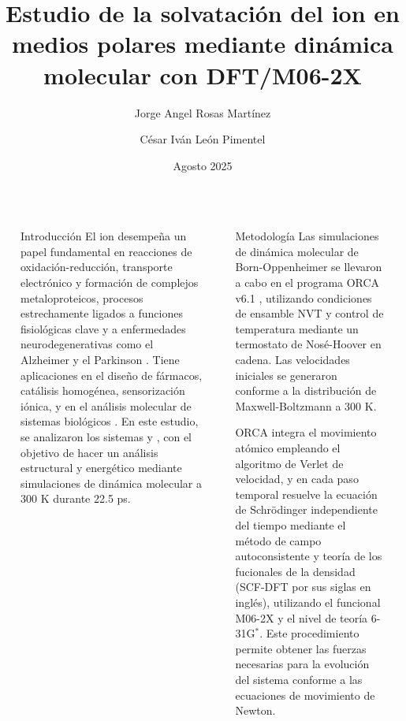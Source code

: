 \documentclass[final]{beamer}
\title{Estudio de la solvatación del ion \ce{Cu^{2+}} en medios polares mediante dinámica molecular con DFT/M06-2X}
\author{Jorge Angel Rosas Martínez \inst{1} \and César Iván León Pimentel \inst{2}}
\institute[shortinst]{\inst{1} Facultad de Química, UNAM }
\date{Agosto 2025}
\newlength{\sepwidth}
\newlength{\colwidth}
\newcommand{\separatorcolumn}{\begin{column}{\sepwidth}\end{column}}
\begin{document}
	
\begin{frame}[t]
	
	\begin{columns}[t]
		\separatorcolumn

		\begin{column}{\colwidth}
			\begin{block}{Introducción}
				El ion  desempeña un papel fundamental en reacciones de oxidación-reducción, transporte electrónico y formación de complejos metaloproteicos, procesos estrechamente ligados a funciones fisiológicas clave y a enfermedades neurodegenerativas como el Alzheimer y el Parkinson \cite{Me-2022-01}. Tiene aplicaciones en el diseño de fármacos, catálisis homogénea, sensorización iónica, y en el análisis molecular de sistemas biológicos \cite{Me-2023-01}. En este estudio, se analizaron los sistemas  y , con el objetivo de hacer un análisis estructural y energético mediante simulaciones de dinámica molecular a 300 K durante 22.5 ps.

			\end{block}

			
		\end{column}

		\separatorcolumn

		\begin{column}{\colwidth}
			\begin{block}{Metodología}
				Las simulaciones de dinámica molecular de Born-Oppenheimer se llevaron a cabo en el programa ORCA v6.1 \cite{orca6.1}, utilizando condiciones de ensamble NVT y control de temperatura mediante un termostato de Nosé-Hoover en cadena. Las velocidades iniciales se generaron conforme a la distribución de Maxwell-Boltzmann a 300 K.

				ORCA integra el movimiento atómico empleando el algoritmo de Verlet de velocidad, y en cada paso temporal resuelve la ecuación de Schrödinger independiente del tiempo mediante el método de campo autoconsistente y teoría de los fucionales de la densidad (SCF-DFT por sus siglas en inglés), utilizando el funcional M06-2X y el nivel de teoría 6-31G$^\ast$. Este procedimiento permite obtener las fuerzas necesarias para la evolución del sistema conforme a las ecuaciones de movimiento de Newton.
			\end{block}			
		\end{column}
		
		\separatorcolumn
	
	\end{columns}


\end{frame}
\end{document}
